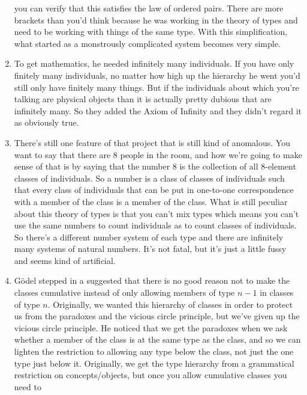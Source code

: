 \documentclass[12pt]{article}
\theoremstyle{definition}
\begin{document}
\begin{enumerate}
        you can verify that this satisfies the law of ordered pairs. There are
        more brackets than you'd think because he was working in the theory of
        types and need to be working with things of the same type. With this
        simplification, what started as a monstrously complicated system becomes
        very simple.
    \item
        To get mathematics, he needed infinitely many individuals. If you have
        only finitely many individuals, no matter how high up the hierarchy he
        went you'd still only have finitely many things. But if the individuals
        about which you're talking are physical objects than it is actually
        pretty dubious that are infinitely many. So they added the Axiom of
        Infinity and they didn't regard it as obviously true.
    \item
        There's still one feature of that project that is still kind of
        anomalous. You want to say that there are 8 people in the room, and how
        we're going to make sense of that is by saying that the number 8 is the
        collection of all 8-element classes of individuals. So a number is a
        class of classes of individuals such that every class of individuals
        that can be put in one-to-one correspondence with a member of the class
        is a member of the class. What is still peculiar about this theory of
        types is that you can't mix types which means you can't use the same
        numbers to count individuals as to count classes of individuals. So
        there's a different number system of each type and there are infinitely
        many systems of natural numbers. It's not fatal, but it's just a little
        fussy and seems kind of artificial. 
    \item
        G\"odel stepped in a suggested that there is no good reason not to make
        the classes cumulative instead of only allowing members of type $n - 1$
        in classes of type $n$. Originally, we wanted this hierarchy of classes
        in order to protect us from the paradoxes and the vicious circle
        principle, but we've given up the vicious circle principle. He noticed
        that we get the paradoxes when we ask whether a member of the class is
        at the same type as the class, and so we can lighten the restriction to
        allowing any type below the class, not just the one type just below it.
        Originally, we get the type hierarchy from a grammatical restriction on
        concepts/objects, but once you allow cumulative classes you need to

\end{enumerate}
\end{document}
